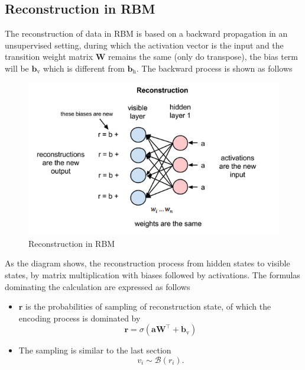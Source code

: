 \documentclass[10pt]{article}
\begin{document}
\subsection{Reconstruction in RBM}
The reconstruction of data in RBM is based on a backward propagation in an unsupervised setting, during which the activation vector is the input and the transition weight matrix $\mathbf{W}$ remains the same (only do transpose), the bias term will be $\mathbf{b}_{\text{v}}$ which is different from $\mathbf{b}_{\text{h}}$. The backward process is shown as follows
\begin{figure}[H]
\centering
\includegraphics[scale=.6]{reconstruction_RBM.png}
\caption{Reconstruction in RBM}
\label{rec_rbm}
\end{figure}
As the diagram shows, the reconstruction process from hidden states to visible states, by matrix multiplication with biases followed by activations. The formulas dominating the calculation are expressed as follows
\begin{itemize}
\item $\mathbf{r}$ is the probabilities of sampling of reconstruction state, of which the encoding process is dominated by
$$\mathbf{r} = \sigma\left(\mathbf{a}\mathbf{W}^\intercal + \mathbf{b}_{\text{v}}\right)$$
\item The sampling is similar to the last section
$$v_i \sim \mathcal{B}\left(r_i\right)\text{.}$$
\end{itemize}
\end{document}
